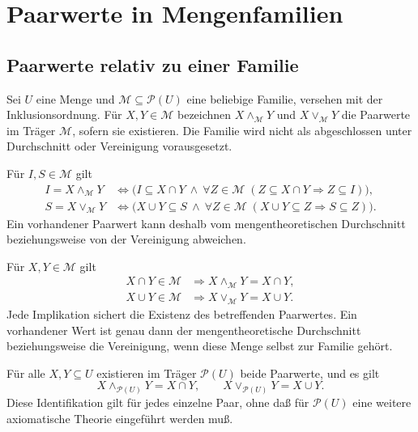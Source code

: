 \chapter{Paarwerte in Mengenfamilien}
\label{b14guide:ch:sets}

\section{Paarwerte relativ zu einer Familie}

\begin{definition}
\label{b14guide:def:family}
Sei $U$ eine Menge und $\mathcal M\subseteq\mathcal P(U)$
eine beliebige Familie, versehen mit der Inklusionsordnung.
Für $X,Y\in\mathcal M$ bezeichnen
$X\wedge_{\mathcal M}Y$ und $X\vee_{\mathcal M}Y$
die Paarwerte im Träger $\mathcal M$, sofern sie existieren.
Die Familie wird nicht als abgeschlossen unter Durchschnitt
oder Vereinigung vorausgesetzt.
\end{definition}

\begin{theorem}
\label{b14guide:thm:family-characterization}
Für $I,S\in\mathcal M$ gilt
\[
\begin{aligned}
 I=X\wedge_{\mathcal M}Y
 &\Longleftrightarrow
 \bigl(I\subseteq X\cap Y\ \land\
 \forall Z\in\mathcal M\;(Z\subseteq X\cap Y\Rightarrow Z\subseteq I)\bigr),\\
 S=X\vee_{\mathcal M}Y
 &\Longleftrightarrow
 \bigl(X\cup Y\subseteq S\ \land\
 \forall Z\in\mathcal M\;(X\cup Y\subseteq Z\Rightarrow S\subseteq Z)\bigr).
\end{aligned}
\]
Ein vorhandener Paarwert kann deshalb vom mengentheoretischen
Durchschnitt beziehungsweise von der Vereinigung abweichen.
\end{theorem}

\begin{theorem}
\label{b14guide:thm:family-operations}
Für $X,Y\in\mathcal M$ gilt
\[
\begin{aligned}
 X\cap Y\in\mathcal M
 &\Longrightarrow X\wedge_{\mathcal M}Y=X\cap Y,\\
 X\cup Y\in\mathcal M
 &\Longrightarrow X\vee_{\mathcal M}Y=X\cup Y.
\end{aligned}
\]
Jede Implikation sichert die Existenz des betreffenden Paarwertes.
Ein vorhandener Wert ist genau dann der mengentheoretische
Durchschnitt beziehungsweise die Vereinigung, wenn diese Menge
selbst zur Familie gehört.
\end{theorem}

\begin{theorem}
\label{b14guide:thm:powerset}
Für alle $X,Y\subseteq U$ existieren im Träger $\mathcal P(U)$
beide Paarwerte, und es gilt
\[
 X\wedge_{\mathcal P(U)}Y=X\cap Y,\qquad
 X\vee_{\mathcal P(U)}Y=X\cup Y.
\]
Diese Identifikation gilt für jedes einzelne Paar, ohne daß
für $\mathcal P(U)$ eine weitere axiomatische Theorie
eingeführt werden muß.
\end{theorem}